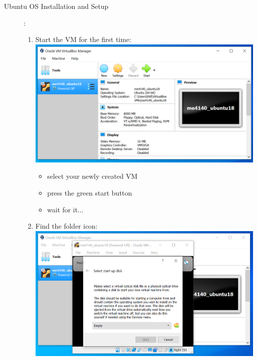 \documentclass[12pt]{article}
\begin{document}
\begin{description}
		\item[Ubuntu OS Installation and Setup]: \vspace{20mm} \\

\begin{enumerate}
\item Start the VM for the first time: \vspace{20mm} \\
      		\hspace*{-2.5cm}\includegraphics[scale=.6]{Capture9.png}\\
            \begin{itemize}
                    
                 \item select your newly created VM      
                 \item press the green start button
                 \item wait for it...       
            \end{itemize}
	\newpage
\item Find the folder icon: \vspace{5mm} \\
      		\hspace*{-2.5cm}\includegraphics[scale=.6]{Capture10.png}\\
            \begin{itemize}
                    

\end{itemize}
\end{enumerate}
\end{description}
\end{document}
